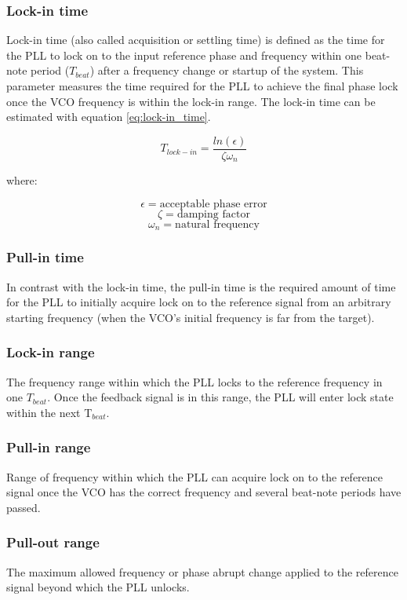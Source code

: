 \subsubsection{Lock-in time}
Lock-in time (also called acquisition or settling time) is defined as the time for the PLL to lock on to the input reference phase and frequency within one 
beat-note period ($T_{beat}$) after a frequency change or startup of the system. This parameter measures the time required for the PLL
to achieve the final phase lock once the VCO frequency is within the lock-in range. The lock-in time can be estimated with equation
\eqref{eq:lock-in_time}.

\begin{equation}
    T_{lock-in} = \frac{ln(\epsilon)}{\zeta \omega_{n}}
    \label{eq:lock-in_time}
\end{equation}

where:

\[\epsilon = \text{acceptable phase error}\]
\[\zeta = \text{damping factor}\]
\[\omega_{n} = \text{natural frequency}\]


\subsubsection{Pull-in time}
In contrast with the lock-in time, the pull-in time is the required amount of time for the PLL to initially acquire lock on to the 
reference signal from an arbitrary starting frequency (when the VCO's initial frequency is far from the target).
\subsubsection{Lock-in range}
The frequency range within which the PLL locks to the reference frequency in one $T_{beat}$. Once the feedback signal is in this 
range, the PLL will enter lock state within the next T$_{beat}$.
\subsubsection{Pull-in range}
Range of frequency within which the PLL can acquire lock on to the reference signal once the VCO has the correct frequency and several 
beat-note periods have passed.
\subsubsection{Pull-out range}
The maximum allowed frequency or phase abrupt change applied to the reference signal beyond which the PLL unlocks.

